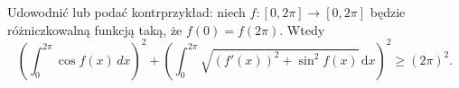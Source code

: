 %

\begin{problem}[pytanie 3981861]
    Udowodnić lub podać kontrprzykład: niech $f \colon [0, 2\pi] \to [0, 2\pi]$ będzie różniczkowalną funkcją taką, że $f(0) = f(2\pi)$. Wtedy
    \label{stack_3981861}%
    \begin{equation}
        \left(\int_0^{2 \pi} \cos f(x) \,d x\right)^2
        +
        \left(\int_0^{2 \pi} \sqrt{(f'(x))^2+\sin^2 f(x)} \, \mathrm{d}x\right)^2 \ge (2 \pi)^2.
    \end{equation}
\end{problem}

%